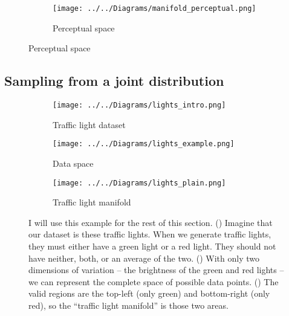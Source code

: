 \documentclass[11pt, a4paper, openany]{book}
\newcommand{\nquote}[1]{``{#1}''}
\begin{document}
\begin{figure}
\ContinuedFloat
    \centering	
    \begin{subfigure}{\columnwidth}
        \centering
        \caption{Perceptual space}
        \texttt{[image: ../../Diagrams/manifold\_perceptual.png]} 
        \label{manifold:perceptual}
    \end{subfigure}
\end{figure}


\subsection{Sampling from a joint distribution}

\begin{figure}
  \centering
  
      \begin{subfigure}{0.7\columnwidth}
        \centering
        \caption{Traffic light dataset}
        \texttt{[image: ../../Diagrams/lights\_intro.png]} 
        \label{trafficlights:example}
    \end{subfigure}
    \vspace{1cm}
    
    \begin{subfigure}{0.45\columnwidth}
        \centering
        \caption{Data space}
        \texttt{[image: ../../Diagrams/lights\_example.png]} 
        \label{trafficlights:axes}
    \end{subfigure}
    \hfill
    \begin{subfigure}{0.45\columnwidth}
        \centering
        \caption{Traffic light manifold}
        \texttt{[image: ../../Diagrams/lights\_plain.png]} 
        \label{trafficlights:manifold}
    \end{subfigure}
  \caption[Traffic light example]{I will use this example for the rest of this section. () Imagine that our dataset is these traffic lights. When we generate traffic lights, they must either have a green light or a red light. They should not have neither, both, or an average of the two. () With only two dimensions of variation -- the brightness of the green and red lights -- we can represent the complete space of possible data points. () The valid regions are the top-left (only green) and bottom-right (only red), so the \nquote{traffic light manifold} is those two areas.}
  \label{trafficlights}
\end{figure}
\end{document}
